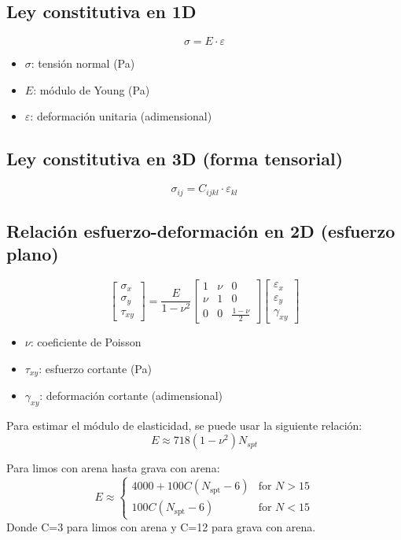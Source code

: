 \documentclass{article} %
\begin{document}
\subsection*{Ley constitutiva en 1D}
\[
\sigma = E \cdot \varepsilon
\]
\begin{itemize}
    \item $\sigma$: tensión normal (Pa)
    \item $E$: módulo de Young (Pa)
    \item $\varepsilon$: deformación unitaria (adimensional)
\end{itemize}

\subsection*{Ley constitutiva en 3D (forma tensorial)}
\[
\sigma_{ij} = C_{ijkl} \cdot \varepsilon_{kl}
\]

\subsection*{Relación esfuerzo-deformación en 2D (esfuerzo plano)}
\[
\begin{bmatrix}
\sigma_x \\
\sigma_y \\
\tau_{xy}
\end{bmatrix}
=
\frac{E}{1 - \nu^2}
\begin{bmatrix}
1 & \nu & 0 \\
\nu & 1 & 0 \\
0 & 0 & \frac{1 - \nu}{2}
\end{bmatrix}
\begin{bmatrix}
\varepsilon_x \\
\varepsilon_y \\
\gamma_{xy}
\end{bmatrix}
\]
\begin{itemize}
    \item $\nu$: coeficiente de Poisson
    \item $\tau_{xy}$: esfuerzo cortante (Pa)
    \item $\gamma_{xy}$: deformación cortante (adimensional)
\end{itemize}

Para estimar el módulo de elasticidad, se puede usar la siguiente relación:
\begin{equation}
    E \approx 718(1- \nu^2)N_{spt}
\end{equation}

Para limos con arena hasta grava con arena:
\begin{equation}
E \approx 
\begin{cases}
4000 + 100C(N_{\text{spt}} - 6) & \text{for } N > 15 \\
100C(N_{\text{spt}} - 6)        & \text{for } N < 15
\end{cases}
\end{equation}
Donde C=3 para limos con arena y C=12 para grava con arena.
\end{document}
